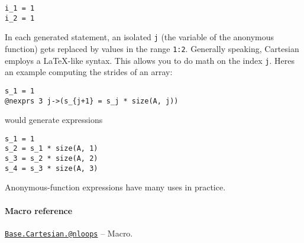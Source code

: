 \begin{verbatim}
i_1 = 1
i_2 = 1
\end{verbatim}



In each generated statement, an {\textquotedbl}isolated{\textquotedbl} \texttt{j} (the variable of the anonymous function) gets replaced by values in the range \texttt{1:2}. Generally speaking, Cartesian employs a LaTeX-like syntax.  This allows you to do math on the index \texttt{j}.  Here{\textquotesingle}s an example computing the strides of an array:




\begin{verbatim}
s_1 = 1
@nexprs 3 j->(s_{j+1} = s_j * size(A, j))
\end{verbatim}



would generate expressions




\begin{verbatim}
s_1 = 1
s_2 = s_1 * size(A, 1)
s_3 = s_2 * size(A, 2)
s_4 = s_3 * size(A, 3)
\end{verbatim}



Anonymous-function expressions have many uses in practice.



\hypertarget{908996570436533510}{}


\paragraph{Macro reference}


\hypertarget{4938945836201444124}{}
\hyperlink{4938945836201444124}{\texttt{Base.Cartesian.@nloops}}  -- {Macro.}

